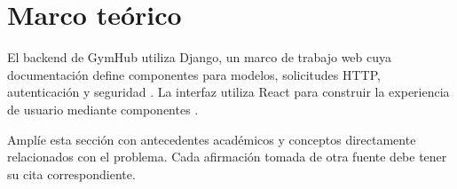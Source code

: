 \section{Marco teórico}

El backend de GymHub utiliza Django, un marco de trabajo web cuya documentación
define componentes para modelos, solicitudes HTTP, autenticación y seguridad
\parencite{django_documentacion}. La interfaz utiliza React para construir la
experiencia de usuario mediante componentes \parencite{react_documentacion}.

Amplíe esta sección con antecedentes académicos y conceptos directamente
relacionados con el problema. Cada afirmación tomada de otra fuente debe tener
su cita correspondiente.
